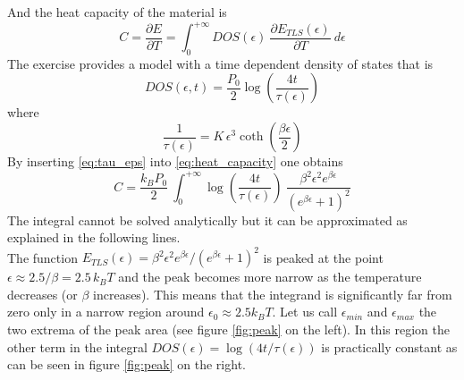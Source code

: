 \documentclass{article}
\begin{document}
And the heat capacity of the material is 
\begin{equation}
    C = \frac{\partial E}{\partial T} = \int_0^{+\infty} DOS(\epsilon) \ \frac{\partial E_{TLS}(\epsilon)}{\partial T} \ d\epsilon
    \label{eq:heat_capacity}
\end{equation}
The exercise provides a model with a time dependent density of states that is
\begin{equation}
    DOS(\epsilon, t) = \frac{P_0}{2}\log\left(\frac{4t}{\tau(\epsilon)}\right)
    \label{eq:DOS_t_dep}
\end{equation}
where
\begin{equation}
    \frac{1}{\tau(\epsilon)} = K \, \epsilon^3 \coth\left(\frac{\beta\epsilon}{2}\right)
    \label{eq:tau_eps}
\end{equation}
By inserting \ref{eq:tau_eps} into \ref{eq:heat_capacity} one obtains
\begin{equation}
    C = \frac{k_BP_0}{2} \ \int_0^{+\infty} \log\left(\frac{4t}{\tau(\epsilon)}\right) \ \frac{\beta^2\epsilon^2 e^{\beta\epsilon}}{(e^{\beta \epsilon} + 1)^2}
    \label{eq:big_integral}
\end{equation}
The integral cannot be solved analytically but it can be approximated as explained in the following lines. \\
The function $E_{TLS}(\epsilon) = \beta^2\epsilon^2e^{\beta\epsilon}/(e^{\beta\epsilon} + 1)^2$ is peaked at the point
$\epsilon \approx 2.5/\beta = 2.5 \, k_B T$ and the peak becomes more narrow as the temperature decreases (or $\beta$ increases). This means that the integrand is significantly far from zero only 
in a narrow region around $\epsilon_0 \approx 2.5 k_B T$. Let us call $\epsilon_{min}$ and $\epsilon_{max}$ the two extrema of the peak area (see figure \ref{fig:peak} on the left). In this region the other term in the integral $DOS(\epsilon) = \log(4t/\tau(\epsilon))$
is practically constant as can be seen in figure \ref{fig:peak} on the right. 
\end{document}
